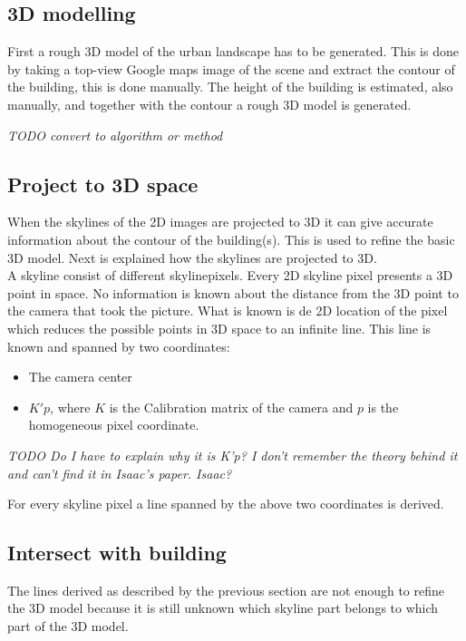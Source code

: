 \documentclass[10pt]{article}
\begin{document}
   \subsection{3D modelling}
First a rough 3D model of the urban landscape has to be generated. This is done
by taking a top-view Google maps image of the scene and extract the contour of
the building, this is done manually. 
The height of the building is estimated, also manually, and together with the
contour a rough 3D model is generated. 




\textit{TODO convert to algorithm or method }
\subsection{Project to 3D space}
When the skylines of the 2D images are projected to 3D it can give 
accurate information about the contour of the building(s). This is used to
refine the basic 3D model.  Next is explained how the skylines are projected to
3D.\\

A skyline consist of different skylinepixels. Every 2D skyline pixel presents a 3D point in space. No
information is known about the distance from the 3D point to the camera that
took the picture. What is known is de 2D location of the pixel which reduces the possible points in 3D
space to an infinite line.  This line is known and spanned by two 
coordinates:\\ 
\begin{itemize}
	\item The camera center %
	\item $K'p$, where $K$ is the Calibration matrix of the camera and $p$ is the homogeneous pixel coordinate.
\end{itemize}

\textit{ TODO Do I have to explain why it is K'p? I don't remember the theory behind it and can't find it in
Isaac's paper. Isaac? }

For every skyline pixel a line spanned by the above two coordinates is derived.


\subsection{Intersect with building}
The lines derived as described by the previous section are not enough to refine
the 3D model because it is still unknown which skyline part belongs to which
part of the 3D model.
\end{document}
